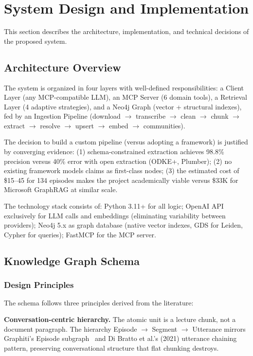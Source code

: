 \section{System Design and Implementation}
\label{sec:development}

This section describes the architecture, implementation, and technical decisions of the proposed system.

\subsection{Architecture Overview}

The system is organized in four layers with well-defined responsibilities: a Client Layer (any MCP-compatible LLM), an MCP Server (6 domain tools), a Retrieval Layer (4 adaptive strategies), and a Neo4j Graph (vector + structural indexes), fed by an Ingestion Pipeline (download $\rightarrow$ transcribe $\rightarrow$ clean $\rightarrow$ chunk $\rightarrow$ extract $\rightarrow$ resolve $\rightarrow$ upsert $\rightarrow$ embed $\rightarrow$ communities).

The decision to build a custom pipeline (versus adopting a framework) is justified by converging evidence: (1) schema-constrained extraction achieves 98.8\% precision versus 40\% error with open extraction (ODKE+, Plumber); (2) no existing framework models claims as first-class nodes; (3) the estimated cost of \$15--45 for 134 episodes makes the project academically viable versus \$33K for Microsoft GraphRAG at similar scale.

The technology stack consists of: Python 3.11+ for all logic; OpenAI API exclusively for LLM calls and embeddings (eliminating variability between providers); Neo4j 5.x as graph database (native vector indexes, GDS for Leiden, Cypher for queries); FastMCP for the MCP server.

\subsection{Knowledge Graph Schema}

\subsubsection{Design Principles}

The schema follows three principles derived from the literature:

\textbf{Conversation-centric hierarchy.} The atomic unit is a lecture chunk, not a document paragraph. The hierarchy Episode $\rightarrow$ Segment $\rightarrow$ Utterance mirrors Graphiti's Episode subgraph~\cite{rasmussen2025graphiti} and Di Bratto et al.'s (2021) utterance chaining pattern, preserving conversational structure that flat chunking destroys.


